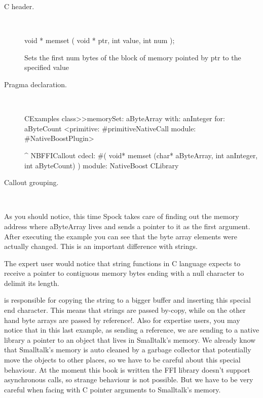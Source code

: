 \documentclass[a4paper,10pt,twoside]{book}
\begin{document}
\begin{description}
\item [C header.] \ 

\begin{code}{}
void * memset ( void * ptr, int value, int num );
\end{code}
Sets the first num bytes of the block of memory pointed by ptr to the specified value

\item [Pragma declaration.] \ 

\begin{code}{}
CExamples class>>memorySet: aByteArray with: anInteger for: aByteCount
	<primitive: #primitiveNativeCall module: #NativeBoostPlugin>
	
	^ NBFFICallout cdecl: #( void* memset (char* aByteArray, int anInteger, int aByteCount) ) module: NativeBoost CLibrary
\end{code}


\item [Callout grouping.] \ 
 

\end{description}

As you should notice, this time Spock takes care of finding out the memory address where aByteArray lives and sends a pointer to it as the first argument. After executing the example you can see that the byte array elements were actually changed. This is an important difference with strings. 


The expert user would notice that string functions in C language expects to receive a pointer to contiguous memory bytes ending with a null character to delimit its length. 

\Spock is responsible for copying the string to a bigger buffer and inserting this special end character. This means that strings are passed by-copy, while on the other hand byte arrays are passed by reference!. Also for expertise users, you may notice that in this last example, as sending a reference, we are sending to a native library a pointer to an object that lives in Smalltalk's memory. We already know that Smalltalk's memory is auto cleaned by a garbage collector that potentially move the objects to other places, so we have to be careful about this special behaviour. At the moment this book is written the FFI library doesn't support asynchronous calls, so strange behaviour is not possible. But we have to be very careful when facing with C pointer arguments to Smalltalk's memory.
\end{document}
